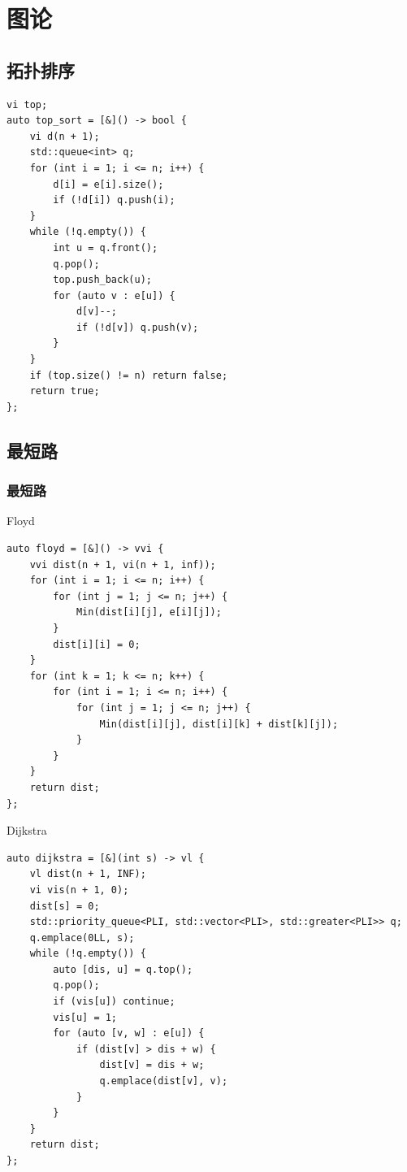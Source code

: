 \documentclass[UTF8, a4paper, titlepage, twoside]{ctexart}
\begin{document}
\newpage
\section{ 图论 }

\subsection{ 拓扑排序 }
\begin{lstlisting}[style=cpp]
vi top;
auto top_sort = [&]() -> bool {
    vi d(n + 1);
    std::queue<int> q;
    for (int i = 1; i <= n; i++) {
        d[i] = e[i].size();
        if (!d[i]) q.push(i);
    }
    while (!q.empty()) {
        int u = q.front();
        q.pop();
        top.push_back(u);
        for (auto v : e[u]) {
            d[v]--;
            if (!d[v]) q.push(v);
        }
    }
    if (top.size() != n) return false;
    return true;
};
\end{lstlisting}

\subsection{ 最短路 }
\subsubsection{ 最短路 }
Floyd
\begin{lstlisting}[style=cpp]
auto floyd = [&]() -> vvi {
    vvi dist(n + 1, vi(n + 1, inf));
    for (int i = 1; i <= n; i++) {
        for (int j = 1; j <= n; j++) {
            Min(dist[i][j], e[i][j]);
        }
        dist[i][i] = 0;
    }
    for (int k = 1; k <= n; k++) {
        for (int i = 1; i <= n; i++) {
            for (int j = 1; j <= n; j++) {
                Min(dist[i][j], dist[i][k] + dist[k][j]);
            }
        }
    }
    return dist;
};
\end{lstlisting}

Dijkstra
\begin{lstlisting}[style=cpp]
auto dijkstra = [&](int s) -> vl {
    vl dist(n + 1, INF);
    vi vis(n + 1, 0);
    dist[s] = 0;
    std::priority_queue<PLI, std::vector<PLI>, std::greater<PLI>> q;
    q.emplace(0LL, s);
    while (!q.empty()) {
        auto [dis, u] = q.top();
        q.pop();
        if (vis[u]) continue;
        vis[u] = 1;
        for (auto [v, w] : e[u]) {
            if (dist[v] > dis + w) {
                dist[v] = dis + w;
                q.emplace(dist[v], v);
            }
        }
    }
    return dist;
};
\end{lstlisting}
\end{document}
